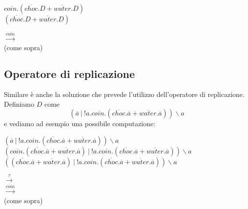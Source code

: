 		\begin{minipage}{0.4\textwidth}
			\begin{flushleft}
				\vspace{5 mm}
				$coin.(\overline{choc}.D + \overline{water}.D)$\\
				\vspace{5 mm}
				$(\overline{choc}.D + \overline{water}.D)$\\
			\end{flushleft}
		\end{minipage}
		\begin{minipage}{0.55\textwidth}
			\begin{flushright}
				\vspace{5 mm}
				$\xrightarrow{coin}$\\
				\vspace{5 mm}
				(come sopra)\\
			\end{flushright}
		\end{minipage}
		
		\subsection{Operatore di replicazione}
		
		Similare è anche la soluzione che prevede l'utilizzo dell'operatore di replicazione. Definiamo $D$ come
		$$(\overline{a}\ |\ !a.coin.(\overline{choc}.\overline{a} + \overline{water}.\overline{a}))\backslash a$$ e vediamo ad esempio una possibile computazione:
		
		\begin{minipage}{0.6\linewidth}
			\begin{flushleft}
				\vspace{5 mm}
				$(\overline{a}\ |\ !a.coin.(\overline{choc}.\overline{a} + \overline{water}.\overline{a}))\backslash a$\\
				\vspace{5 mm}
				$(coin.(\overline{choc}.\overline{a} + \overline{water}.\overline{a})\ |\ !a.coin.(\overline{choc}.\overline{a} + \overline{water}.\overline{a}))\backslash a$\\
				\vspace{7 mm}
				$((\overline{choc}.\overline{a} + \overline{water}.\overline{a})\ |\ !a.coin.(\overline{choc}.\overline{a} + \overline{water}.\overline{a}))\backslash a$
			\end{flushleft}
		\end{minipage}
		\hfill
		\begin{minipage}{0.1\linewidth}
			\begin{flushright}
				\vspace{5 mm}
				$\xrightarrow{\tau}$\\
				\vspace{8 mm}
				$\xrightarrow{coin}$\\
				\vspace{8 mm}
				(come sopra)
			\end{flushright}
		\end{minipage}
		

